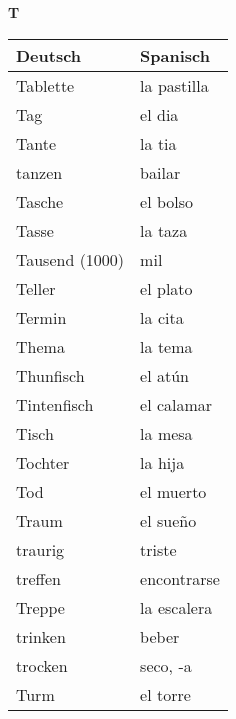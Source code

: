 \begin{flushright}\begin{Huge}\textbf{T}\end{Huge}\end{flushright}

\begin{longtable}{p{} p{}} 
\textbf{Deutsch}     & \textbf{Spanisch}                                       \\ \hline
\hline
\endhead %
Tablette & la pastilla\\
Tag & el dia \\
Tante & la tia\\
tanzen & bailar\\
Tasche & el bolso\\
Tasse & la taza\\
Tausend (1000) & mil\\
Teller & el plato\\
Termin & la cita\\
Thema & la tema\\
Thunfisch & el atún\\
Tintenfisch & el calamar\\
Tisch & la mesa\\
Tochter & la hija\\
Tod & el muerto\\
Traum & el sueño\\
traurig & triste \\
treffen & encontrarse\\
Treppe & la escalera\\
trinken & beber\\
trocken & seco, -a\\
Turm & el torre\\

\end{longtable}
